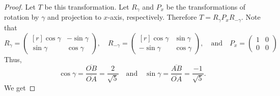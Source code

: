 \documentclass{article}
\begin{document}
\begin{proof}
  Let $T$ be this transformation. Let $R_{\gamma}$ and $P_x$ be the
  transformations of rotation by $\gamma$ and projection to $x$-axis,
  respectively. Therefore $T=R_{\gamma}P_xR_{-\gamma}$. Note that
  \[
    R_{\gamma}=
    \begin{pmatrix*}[r]
      \cos\gamma &-\sin\gamma\\
      \sin\gamma &\cos\gamma
    \end{pmatrix*},
    \quad
    R_{-\gamma}=
    \begin{pmatrix*}[r]
      \cos\gamma &\sin\gamma\\
      -\sin\gamma &\cos\gamma
    \end{pmatrix*},
    \quad\text{and}\quad
    P_x=
    \begin{pmatrix}
      1  &0\\
      0  &0
    \end{pmatrix}
  \]
  Thus, 
  \[
    \cos\gamma=\frac{\overline{OB}}{\overline{OA}}=\frac{2}{\sqrt{5}}
    \quad\text{and}\quad
    \sin\gamma=\frac{\overline{AB}}{\overline{OA}}=\frac{-1}{\sqrt{5}}.
  \]
  We get
\end{proof}
\end{document}

